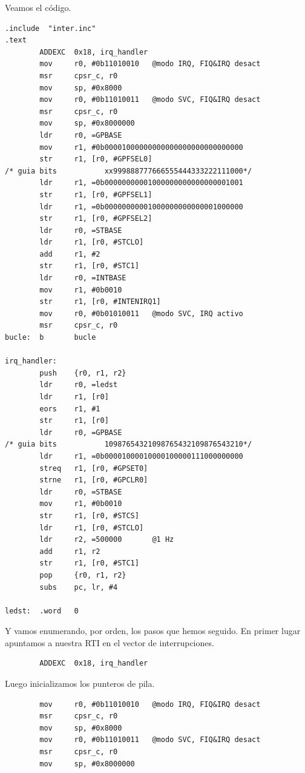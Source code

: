 Veamos el código.

\begin{lstlisting}[caption={inter2.s},label={lst:codigoPract5_2}]
        .include  "inter.inc"
.text
        ADDEXC  0x18, irq_handler
        mov     r0, #0b11010010   @modo IRQ, FIQ&IRQ desact
        msr     cpsr_c, r0
        mov     sp, #0x8000
        mov     r0, #0b11010011   @modo SVC, FIQ&IRQ desact
        msr     cpsr_c, r0
        mov     sp, #0x8000000
        ldr     r0, =GPBASE
        mov     r1, #0b00001000000000000000000000000000
        str     r1, [r0, #GPFSEL0]
/* guia bits           xx999888777666555444333222111000*/
        ldr     r1, =0b00000000001000000000000000001001
        str     r1, [r0, #GPFSEL1]
        ldr     r1, =0b00000000001000000000000001000000
        str     r1, [r0, #GPFSEL2]
        ldr     r0, =STBASE
        ldr     r1, [r0, #STCLO]
        add     r1, #2
        str     r1, [r0, #STC1]
        ldr     r0, =INTBASE
        mov     r1, #0b0010
        str     r1, [r0, #INTENIRQ1]
        mov     r0, #0b01010011   @modo SVC, IRQ activo
        msr     cpsr_c, r0
bucle:  b       bucle

irq_handler:
        push    {r0, r1, r2}
        ldr     r0, =ledst
        ldr     r1, [r0]
        eors    r1, #1
        str     r1, [r0]
        ldr     r0, =GPBASE
/* guia bits           10987654321098765432109876543210*/
        ldr     r1, =0b00001000010000100000111000000000
        streq   r1, [r0, #GPSET0]
        strne   r1, [r0, #GPCLR0]
        ldr     r0, =STBASE
        mov     r1, #0b0010
        str     r1, [r0, #STCS]
        ldr     r1, [r0, #STCLO]
        ldr     r2, =500000       @1 Hz
        add     r1, r2
        str     r1, [r0, #STC1]
        pop     {r0, r1, r2}
        subs    pc, lr, #4

ledst:  .word   0
\end{lstlisting}

Y vamos enumerando, por orden, los pasos que hemos seguido. En primer lugar apuntamos a nuestra
RTI en el vector de interrupciones.

\begin{lstlisting}
        ADDEXC  0x18, irq_handler
\end{lstlisting}

Luego inicializamos los punteros de pila.

\begin{lstlisting}
        mov     r0, #0b11010010   @modo IRQ, FIQ&IRQ desact
        msr     cpsr_c, r0
        mov     sp, #0x8000
        mov     r0, #0b11010011   @modo SVC, FIQ&IRQ desact
        msr     cpsr_c, r0
        mov     sp, #0x8000000
\end{lstlisting}

